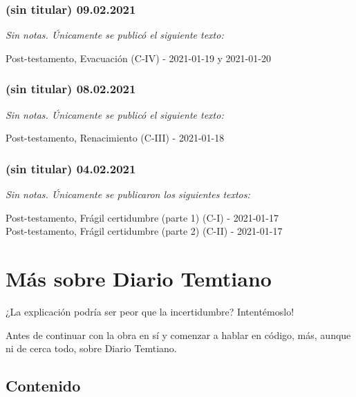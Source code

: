 \documentclass[
]{book}
\begin{document}
\hypertarget{sin-titular-09.02.2021}{%
\subsection*{(sin titular) 09.02.2021}\label{sin-titular-09.02.2021}}

\emph{Sin notas. Únicamente se publicó el siguiente texto:}

Post-testamento, Evacuación (C-IV) - 2021-01-19 y 2021-01-20

\hypertarget{sin-titular-08.02.2021}{%
\subsection*{(sin titular) 08.02.2021}\label{sin-titular-08.02.2021}}

\emph{Sin notas. Únicamente se publicó el siguiente texto:}

Post-testamento, Renacimiento (C-III) - 2021-01-18

\hypertarget{sin-titular-04.02.2021}{%
\subsection*{(sin titular) 04.02.2021}\label{sin-titular-04.02.2021}}

\emph{Sin notas. Únicamente se publicaron los siguientes textos:}

Post-testamento, Frágil certidumbre (parte 1) (C-I) - 2021-01-17~\\
Post-testamento, Frágil certidumbre (parte 2) (C-II) - 2021-01-17

\hypertarget{muxe1s-sobre-diario-temtiano}{%
\chapter*{Más sobre Diario Temtiano}\label{muxe1s-sobre-diario-temtiano}}

¿La explicación podría ser peor que la incertidumbre? Intentémoslo!

Antes de continuar con la obra en sí y comenzar a hablar en código, más, aunque ni de cerca todo, sobre Diario Temtiano.

\hypertarget{contenido}{%
\section*{Contenido}\label{contenido}}
\end{document}
